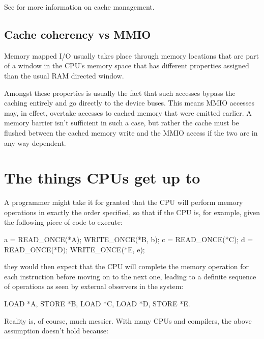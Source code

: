 See  for more information
on cache management.


\subsection{Cache coherency vs MMIO}

Memory mapped I/O usually takes place through memory locations that are part of
a window in the CPU's memory space that has different properties assigned than
the usual RAM directed window.

Amongst these properties is usually the fact that such accesses bypass the
caching entirely and go directly to the device buses.
This means MMIO accesses may, in effect, overtake accesses to cached memory
that were emitted earlier.
A memory barrier isn't sufficient in such a case, but rather the cache must be
flushed between the cached memory write and the MMIO access if the two are in
any way dependent.


\section{The things CPUs get up to}

A programmer might take it for granted that the CPU will perform memory
operations in exactly the order specified, so that if the CPU is, for example,
given the following piece of code to execute:

\begin{VerbatimU}
	a = READ_ONCE(*A);
	WRITE_ONCE(*B, b);
	c = READ_ONCE(*C);
	d = READ_ONCE(*D);
	WRITE_ONCE(*E, e);
\end{VerbatimU}

they would then expect that the CPU will complete the memory operation for each
instruction before moving on to the next one, leading to a definite sequence of
operations as seen by external observers in the system:

\begin{VerbatimU}
	LOAD *A, STORE *B, LOAD *C, LOAD *D, STORE *E.
\end{VerbatimU}

Reality is, of course, much messier.
With many CPUs and compilers, the above assumption doesn't hold because:

